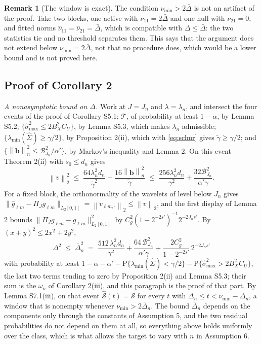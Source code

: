 \documentclass[10pt]{book}
\theoremstyle{definition}
\newtheorem{remark}{Remark}[section]
\newcommand{\Prob}{\mathrm{P}}
\newcommand{\norm}[1]{\left\lVert #1 \right\rVert}
\newcommand{\normn}[1]{\left\lVert #1 \right\rVert_{n}}
\newcommand{\cv}{\ell}
\newcommand{\md}{m}
\newcommand{\gcomp}[2]{g_{#1#2}}
\newcommand{\PiJ}{\Pi_{J}}
\newcommand{\Gramhat}{\widehat{\Sigma}}
\newcommand{\pen}{\lambda}
\newcommand{\penn}{\lambda_{n}}
\newcommand{\seff}{s'}
\newcommand{\bb}{\mathbf{b}}
\newcommand{\smax}{\widehat{\sigma}_{\max}}
\newcommand{\gtil}{\widetilde{\gamma}}
\newcommand{\lmin}{\lambda_{\min}}
\begin{document}
{\begin{remark}[The window is exact]
\label{rem:window}
The condition $\nu_{\min} > 2\bar{\Delta}$ is not an artifact of the proof. Take two blocks,
one active with $\nu_{11} = 2\bar{\Delta}$ and one null with $\nu_{21} = 0$, and fitted
norms $\widehat{\nu}_{11} = \widehat{\nu}_{21} = \bar{\Delta}$, which is compatible with
$\Delta \le \bar{\Delta}$: the two statistics tie and no threshold separates them. This
says that the argument does not extend below $\nu_{\min} = 2\bar{\Delta}$, not that no
procedure does, which would be a lower bound and is not proved here.
\end{remark}

\subsection*{Proof of Corollary 2}

\emph{A nonasymptotic bound on $\Delta$.} Work at $J = J_n$ and $\pen = \penn$,
and intersect the four events of the proof of Corollary S5.1: $\mathcal{T}$,
of probability at least $1-\alpha$, by Lemma S5.2;
$\{\smax^2 \le 2B_X^2C_U\}$, by Lemma S5.3, which makes $\penn$ admissible;
$\{\lmin(\Gramhat) \ge \gamma/2\}$, by Proposition 2(ii), which with
\eqref{eq:schur} gives $\gtil \ge \gamma/2$; and
$\{\normn{\bb}^2 \le \mathcal{B}^2_{J_n}/\alpha'\}$, by Markov's inequality and
Lemma 2. On this event Theorem 2(ii) with $s_0 \le d_n$ gives
\[
  \norm{v}_2^2 \;\le\; \frac{64\penn^2d_n}{\gtil^2}
  + \frac{16\normn{\bb}^2}{\gtil}
  \;\le\; \frac{256\penn^2d_n}{\gamma^2}
  + \frac{32\mathcal{B}^2_{J_n}}{\alpha'\gamma} .
\]
For a fixed block, the orthonormality of the wavelets of level below $J_n$
gives $\lVert\widehat{g}_{\cv\md} - \PiJ\gcomp{\cv}{\md}\rVert_{L_2[0,1]} =
\norm{v_{\cv\md,\cdot}}_2 \le \norm{v}_2$, and the first display of Lemma 2
bounds $\lVert\PiJ\gcomp{\cv}{\md} - \gcomp{\cv}{\md}\rVert^2_{L_2[0,1]}$ by
$C_g^2(1-2^{-2\seff})^{-1}2^{-2J_n\seff}$. By $(x+y)^2 \le 2x^2 + 2y^2$,
\begin{equation}
  \label{eq:Dn}
  \Delta^2 \;\le\; \bar{\Delta}_n^2 \;=\; \frac{512\,\penn^2d_n}{\gamma^2}
  + \frac{64\,\mathcal{B}^2_{J_n}}{\alpha'\gamma}
  + \frac{2C_g^2}{1-2^{-2\seff}}\,2^{-2J_n\seff}
\end{equation}
with probability at least
$1 - \alpha - \alpha' - \Prob\{\lmin(\Gramhat) < \gamma/2\} -
\Prob\{\smax^2 > 2B_X^2C_U\}$, the last two terms tending to zero by
Proposition 2(ii) and Lemma S5.3\textcolor{colR1}{; their sum is the
$\omega_n$ of Corollary 2(iii), and this paragraph is the proof of that
part}. By Lemma S7.1(iii), on that event
$\widehat{\mathcal{S}}(t) = \mathcal{S}$ for every $t$ with $\bar{\Delta}_n \le t < \nu_{\min} - \bar{\Delta}_n$, a window
that is nonempty whenever $\nu_{\min} > 2\bar{\Delta}_n$. The bound $\bar{\Delta}_n$ depends on the
components only through the constants of Assumption 5, and the two residual
probabilities do not depend on them at all, so everything above holds
uniformly over the class, which is what allows the target to vary with $n$ in
Assumption 6.

}
\end{document}
